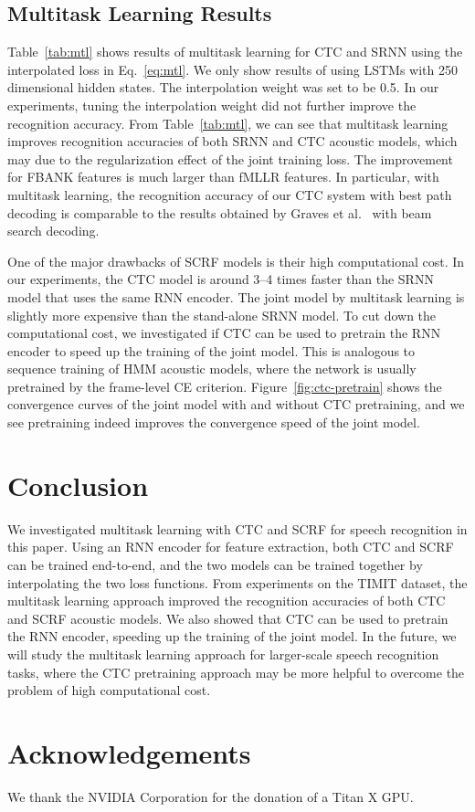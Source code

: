 \documentclass[a4paper]{article}
\begin{document}
\subsection{Multitask Learning Results}

Table~\ref{tab:mtl} shows results of multitask learning for CTC and SRNN using the interpolated loss in Eq.~\eqref{eq:mtl}. We only show results of using LSTMs with 250 dimensional hidden states. The interpolation weight was set to be 0.5. In our experiments, tuning the interpolation weight did not further improve the recognition accuracy. From Table~\ref{tab:mtl}, we can see that multitask learning improves recognition accuracies of both SRNN and CTC acoustic models, which may due to the regularization effect of the joint training loss. The improvement for FBANK features is much larger than fMLLR features. In particular, with multitask learning, the recognition accuracy of our CTC system with best path decoding is comparable to the results obtained by Graves et al.~\cite{graves2013speech} with beam search decoding. 

One of the major drawbacks of SCRF models is their high computational cost. In our experiments, the CTC model is around 3--4 times faster than the SRNN model that uses the same RNN encoder. The joint model by multitask learning is slightly more expensive than the stand-alone SRNN model. To cut down the computational cost, we investigated if CTC can be used to pretrain the RNN encoder to speed up the training of the joint model. This is analogous to sequence training of HMM acoustic models, where the network is usually pretrained by the frame-level CE criterion. Figure~\ref{fig:ctc-pretrain} shows the convergence curves of the joint model with and without CTC pretraining, and we see  pretraining indeed improves the convergence speed of the joint model. %
 

\section{Conclusion}

We investigated multitask learning with CTC and SCRF for speech recognition in this paper. Using an RNN encoder for feature extraction, both CTC and SCRF can be trained end-to-end, and the two models can be trained together by interpolating the two loss functions. From experiments on the TIMIT dataset, the multitask learning approach improved the recognition accuracies of both CTC and SCRF acoustic models. We also showed that CTC can be used to pretrain the RNN encoder, speeding up the training of the joint model. In the future, we will study the multitask learning approach for larger-scale speech recognition tasks, where the CTC pretraining approach may be more helpful to overcome the problem of high computational cost. 


\section{Acknowledgements}

We thank the NVIDIA Corporation for the donation of a Titan X GPU.



\end{document}
